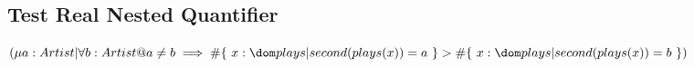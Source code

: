 \documentclass[a4paper,10pt,fleqn]{article}
\begin{document}
\subsection*{Test Real Nested Quantifier}

\noindent
$(\mu a : Artist | \forall b : Artist @ a \neq b \implies \# \{~ x : \dom plays | second(plays(x)) = a ~\} > \# \{~ x : \dom plays | second(plays(x)) = b ~\})$
\end{document}
